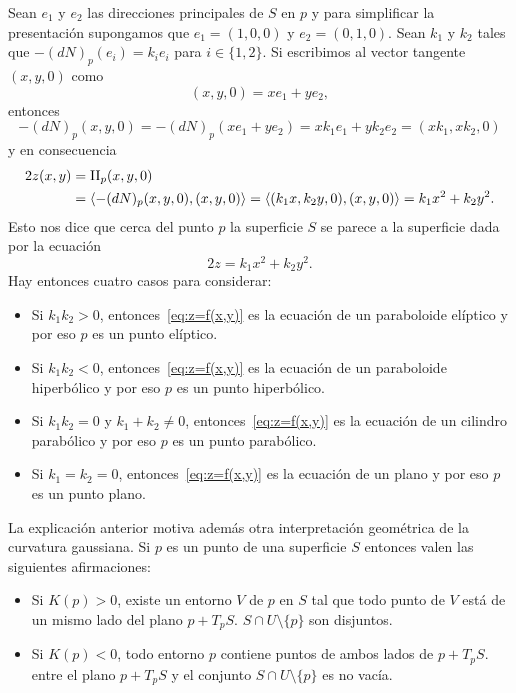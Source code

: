 Sean $e_1$ y $e_2$ las direcciones principales de $S$ en $p$ y para simplificar
la presentación supongamos que $e_1=(1,0,0)$ y $e_2=(0,1,0)$.  Sean $k_1$ y
$k_2$ tales que $-(dN)_p(e_i)=k_ie_i$ para $i\in\{1,2\}$. Si escribimos al
vector tangente $(x,y,0)$ como 
\[
	(x,y,0)=xe_1+ye_2,
\]
entonces 
\[
	-(dN)_p(x,y,0)=-(dN)_p(xe_1+ye_2)=xk_1e_1+yk_2e_2=(xk_1,xk_2,0)
\]
y en consecuencia
\begin{align*}
	2z(x,y)&=\operatorname{II}_p(x,y,0)\\
	&=\langle -(dN)_p(x,y,0),(x,y,0)\rangle
	=\langle (k_1x,k_2y,0),(x,y,0)\rangle
	=k_1x^2+k_2y^2.
\end{align*}
Esto nos dice que cerca del punto $p$ la superficie $S$ se parece a la superficie dada
por la ecuación 
\begin{equation}
	\label{eq:z=f(x,y)}
	2z=k_1x^2+k_2y^2. 
\end{equation}
Hay entonces cuatro casos para considerar: 
\begin{itemize}
	\item Si $k_1k_2>0$, entonces~\eqref{eq:z=f(x,y)} es la ecuación de un
	paraboloide elíptico y por eso $p$ es un punto elíptico.  \item Si
		$k_1k_2<0$, entonces~\eqref{eq:z=f(x,y)} es la ecuación de un
		paraboloide hiperbólico y por eso $p$ es un punto hiperbólico.
	\item Si $k_1k_2=0$ y $k_1+k_2\ne 0$, entonces~\eqref{eq:z=f(x,y)} es la
		ecuación de un cilindro parabólico y por eso $p$ es un punto
		parabólico.
	\item Si $k_1=k_2=0$, entonces~\eqref{eq:z=f(x,y)} es la ecuación de un
		plano y por eso $p$ es un punto plano.
\end{itemize}

La explicación anterior motiva además otra interpretación geométrica de la
curvatura gaussiana. Si $p$ es un punto de una superficie $S$ entonces valen
las siguientes afirmaciones:
\begin{itemize}
	\item Si $K(p)>0$, existe un entorno $V$ de $p$ en $S$ tal que todo
		punto de $V$ está de un mismo lado del plano $p+T_pS$. 
			$S\cap U\setminus\{p\}$ son disjuntos. 
		\item Si $K(p)<0$, todo entorno $p$ contiene puntos de ambos lados de $p+T_pS$. 
			entre el plano $p+T_pS$ y el conjunto $S\cap U\setminus\{p\}$ es no vacía.
\end{itemize}

